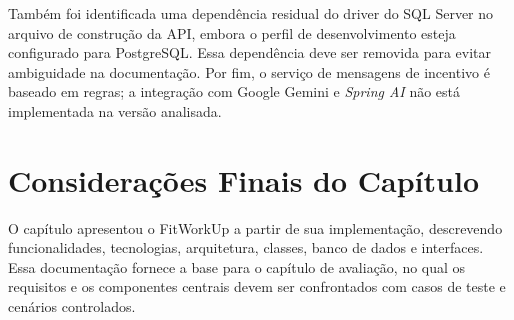 Também foi identificada uma dependência residual do driver do SQL Server no arquivo de construção da API, embora o perfil de desenvolvimento esteja configurado para PostgreSQL. Essa dependência deve ser removida para evitar ambiguidade na documentação. Por fim, o serviço de mensagens de incentivo é baseado em regras; a integração com Google Gemini e \textit{Spring AI} não está implementada na versão analisada.

\section{Considerações Finais do Capítulo}
\label{sec:fitworkup_consideracoes}

O capítulo apresentou o FitWorkUp a partir de sua implementação, descrevendo funcionalidades, tecnologias, arquitetura, classes, banco de dados e interfaces. Essa documentação fornece a base para o capítulo de avaliação, no qual os requisitos e os componentes centrais devem ser confrontados com casos de teste e cenários controlados.
